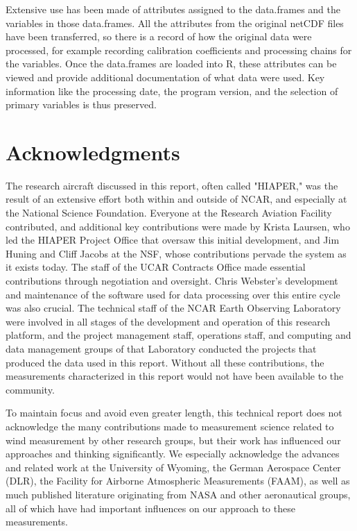 \documentclass[12pt,twoside,english]{article}\usepackage[]{graphicx}\usepackage[]{color}
\let\stdsection\section
\renewcommand{\section}{\newpage\stdsection}
\let\OrgIndex\index
\renewcommand*{\index}[1]{\OrgIndex{#1}}
\begin{document}
Extensive use has been made of attributes assigned to the data.frames
and the variables in those data.frames. All the attributes from the
original netCDF files have been transferred, so there is a record
of how the original data were processed, for example recording%
 calibration
coefficients and processing chains for the variables. Once the data.frames
are loaded into R, these attributes can be viewed and provide additional
documentation of what data were used. Key information like the processing
date, the program version, and the selection of primary variables
is thus preserved.




\section*{Acknowledgments}
\label{sec:acknowledgements}

The research aircraft discussed in this report, often called "HIAPER," was the result of an extensive effort both within and outside of NCAR, and especially at the National Science Foundation. Everyone at the Research Aviation Facility contributed, and additional key contributions were made by Krista Laursen, who led the HIAPER Project Office that oversaw this initial development, and Jim Huning and Cliff Jacobs at the NSF, whose contributions pervade the system as it exists today. The staff of the UCAR Contracts Office made essential contributions through negotiation and oversight. Chris Webster's development and maintenance of the software used for data processing over this entire cycle was also crucial. The technical staff of the NCAR Earth Observing Laboratory were involved in all stages of the development and operation of this research platform, and the project management staff, operations staff, and computing and data management groups of that Laboratory conducted the projects that produced the data used in this report. Without all these contributions, the measurements characterized in this report would not have been available to the community.

To maintain focus and avoid even greater length, this technical report does not acknowledge the many contributions made to measurement science related to wind measurement by other research groups, but their work has influenced our approaches and thinking significantly. We especially acknowledge the advances and related work at the University of Wyoming, the German Aerospace Center (DLR), the Facility for Airborne Atmospheric Measurements (FAAM), as well as much published literature originating from NASA and other aeronautical groups, all of which have had important influences on our approach to these measurements.
\end{document}
